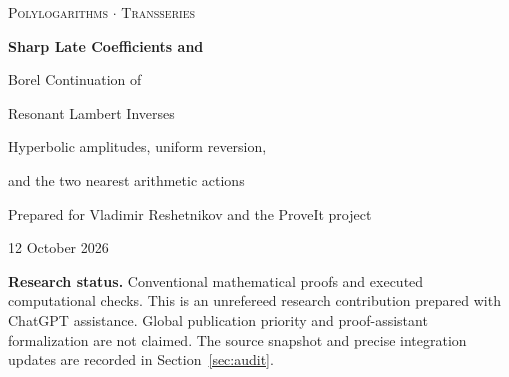 \documentclass[11pt,a4paper]{article}
\numberwithin{equation}{section}
\theoremstyle{definition}
\theoremstyle{remark}
\newcommand{\Z}{\mathbb Z}
\begin{document}
\hypersetup{pageanchor=false}
\begin{titlepage}
\centering
\vspace*{15mm}
{\color{linkteal}\large\textsc{Polylogarithms $\boldsymbol\cdot$ Transseries}}\par
\vspace{11mm}
{\color{inkblue}\LARGE\bfseries Sharp Late Coefficients and\par
\vspace{3mm}Borel Continuation of\par
\vspace{3mm}Resonant Lambert Inverses\par}
\vspace{9mm}
{\large Hyperbolic amplitudes, uniform reversion,\par
and the two nearest arithmetic actions\par}
\vspace{12mm}
{Prepared for Vladimir Reshetnikov and the ProveIt project\par}
\vspace{3mm}
{12 October 2026\par}
\vspace{12mm}
\begin{minipage}{0.91\textwidth}
\begin{abstract}
We resolve the explicit late-coefficient conjecture in the incoming report
\emph{Double Resonance and Nested Stokes Geometry in Polylogarithmic Lambert
Inversion}. Its resonant forward tail has only one odd coefficient, whereas
nonlinear inversion creates every odd sector. We prove the predicted
$\cosh(\pi^2u)$ and $\sinh(\pi^2u)$ amplitudes by a uniform factorial-convolution
estimate, give the first inverse-index correction, and retain uniformity as
the slow parameter $u$ tends to zero. A finite-phase version identifies the
linear forward coefficient as the quantity that dresses the leading action
amplitudes. The two Borel endpoints admit explicit logarithmic models with a
continuous remainder; after the first correction, dilogarithms give a model
with a continuously differentiable remainder. A separate application of
Sauzin's nonlinear resurgence theorems proves continuation outside
$4\pi^2\Z$ and summability away from the real directions. We specify which
claims are new calculations, which are applications of established theory,
and which questions remain open. Exact finite checks and reproducible
numerical diagnostics accompany the proofs.
\end{abstract}
\end{minipage}
\vfill
\begin{minipage}{0.91\textwidth}\small
\textbf{Research status.} Conventional mathematical proofs and executed
computational checks. This is an unrefereed research contribution prepared
with ChatGPT assistance. Global publication priority and proof-assistant
formalization are not claimed. The source snapshot and precise integration
updates are recorded in Section~\ref{sec:audit}.
\end{minipage}
\end{titlepage}
\end{document}
